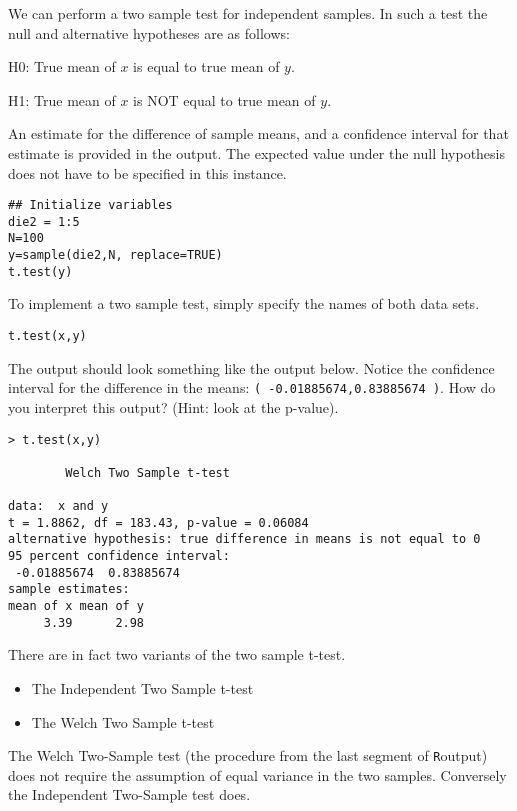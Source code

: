 \documentclass[a4paper,12pt]{article}
\begin{document}
We can perform a two sample test for independent samples. In such a test the null and alternative hypotheses are as follows:

H0: True mean of $x$ is equal to true mean of $y$.

H1: True mean of $x$ is NOT equal to true mean of $y$.

An estimate for the difference of sample means, and a confidence interval for that estimate is provided in the output. The expected value under the null hypothesis does not have to be specified in this instance.

\begin{framed}
\begin{verbatim}
## Initialize variables
die2 = 1:5
N=100
y=sample(die2,N, replace=TRUE)
t.test(y)
\end{verbatim}
\end{framed}

To implement a two sample test, simply specify the names of both data sets.

\begin{framed}
\begin{verbatim}
t.test(x,y)
\end{verbatim}
\end{framed}
The output should look something like the output below. Notice the confidence interval for the difference in the means: \texttt{( -0.01885674,0.83885674 )}.
How do you interpret this output? (Hint: look at the p-value).

\begin{verbatim}
> t.test(x,y)

        Welch Two Sample t-test

data:  x and y
t = 1.8862, df = 183.43, p-value = 0.06084
alternative hypothesis: true difference in means is not equal to 0
95 percent confidence interval:
 -0.01885674  0.83885674
sample estimates:
mean of x mean of y
     3.39      2.98
\end{verbatim}
There are in fact two variants of the two sample t-test.
\begin{itemize}
\item The Independent Two Sample t-test
\item The Welch Two Sample t-test
\end{itemize}
The Welch Two-Sample test (the procedure from the last segment of \texttt{R}output) does not require the assumption of equal variance in the two samples. Conversely the Independent Two-Sample test does.
\end{document}

